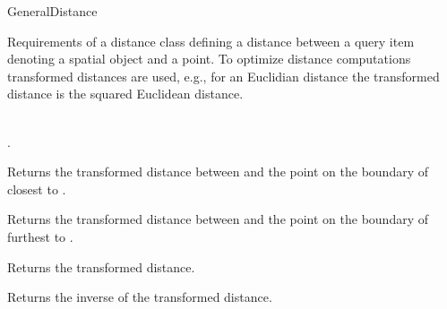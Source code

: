 

\begin{ccRefConcept}{GeneralDistance}


\ccDefinition

Requirements of a distance class defining a distance between a query item
denoting a spatial object and a point.
To optimize distance computations transformed distances are used,
e.g., for an Euclidian distance the transformed distance is the squared Euclidean distance.

\ccHasModels

\\
.


\ccTypes



\ccOperations


{Returns the transformed distance between  and
the point on the boundary of  closest to .}

{Returns the transformed distance between  and
the point on the boundary of  furthest to .}

 {Returns the transformed distance.}

 {Returns the inverse of the transformed distance.}




\end{ccRefConcept}


